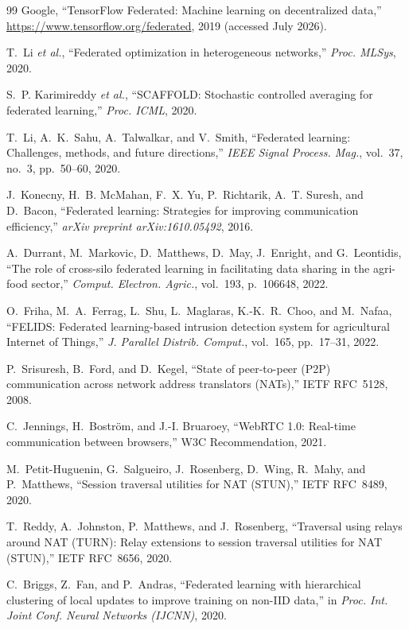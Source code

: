 \documentclass[a4paper,fleqn]{cas-dc}
\begin{document}
\begin{thebibliography}{99}
Google,
``TensorFlow Federated: Machine learning on decentralized data,''
\url{https://www.tensorflow.org/federated}, 2019 (accessed July 2026).

T.~Li \emph{et al.},
``Federated optimization in heterogeneous networks,''
\emph{Proc. MLSys}, 2020.

S.~P. Karimireddy \emph{et al.},
``SCAFFOLD: Stochastic controlled averaging for federated learning,''
\emph{Proc. ICML}, 2020.

T.~Li, A.~K.~Sahu, A.~Talwalkar, and V.~Smith,
``Federated learning: Challenges, methods, and future directions,''
\emph{IEEE Signal Process. Mag.}, vol.~37, no.~3, pp.~50--60, 2020.

J.~Konecny, H.~B. McMahan, F.~X. Yu, P.~Richtarik, A.~T. Suresh, and D.~Bacon,
``Federated learning: Strategies for improving communication efficiency,''
\emph{arXiv preprint arXiv:1610.05492}, 2016.

A.~Durrant, M.~Markovic, D.~Matthews, D.~May, J.~Enright, and G.~Leontidis,
``The role of cross-silo federated learning in facilitating data sharing in the agri-food sector,''
\emph{Comput. Electron. Agric.}, vol.~193, p.~106648, 2022.

O.~Friha, M.~A.~Ferrag, L.~Shu, L.~Maglaras, K.-K.~R.~Choo, and M.~Nafaa,
``FELIDS: Federated learning-based intrusion detection system for agricultural Internet of Things,''
\emph{J. Parallel Distrib. Comput.}, vol.~165, pp.~17--31, 2022.

P.~Srisuresh, B.~Ford, and D.~Kegel,
``State of peer-to-peer (P2P) communication across network address translators (NATs),''
IETF RFC~5128, 2008.

C.~Jennings, H.~Boström, and J.-I. Bruaroey,
``WebRTC 1.0: Real-time communication between browsers,''
W3C Recommendation, 2021.

M.~Petit-Huguenin, G.~Salgueiro, J.~Rosenberg, D.~Wing, R.~Mahy, and P.~Matthews,
``Session traversal utilities for NAT (STUN),''
IETF RFC~8489, 2020.

T.~Reddy, A.~Johnston, P.~Matthews, and J.~Rosenberg,
``Traversal using relays around NAT (TURN): Relay extensions to session traversal utilities for NAT (STUN),''
IETF RFC~8656, 2020.

C.~Briggs, Z.~Fan, and P.~Andras,
``Federated learning with hierarchical clustering of local updates to improve training on non-IID data,''
in \emph{Proc. Int. Joint Conf. Neural Networks (IJCNN)}, 2020.


\end{thebibliography}
\end{document}
